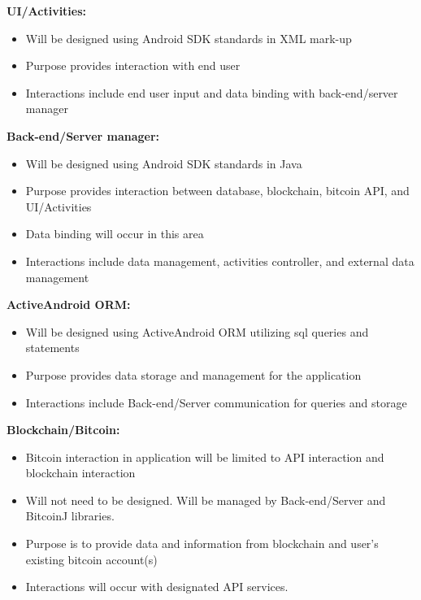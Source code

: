 \textbf{UI/Activities:}\\
\begin{itemize}
\item Will be designed using Android SDK standards in XML mark-up 
\item Purpose provides interaction with end user
\item Interactions include end user input and data binding with back-end/server manager\\
\end{itemize}

\textbf{Back-end/Server manager:}\\
\begin{itemize}
\item Will be designed using Android SDK standards in Java
\item Purpose provides interaction between database, blockchain, bitcoin API, and UI/Activities
\item Data binding will occur in this area
\item Interactions include data management, activities controller, and external data management\\
\end{itemize}

\textbf{ActiveAndroid ORM:}\\
\begin{itemize}
\item Will be designed using  ActiveAndroid ORM utilizing sql queries and statements 
\item Purpose provides data storage and management for the application
\item Interactions include Back-end/Server communication for queries and storage\\
\end{itemize}

\textbf{Blockchain/Bitcoin:}\\
\begin{itemize}
\item Bitcoin interaction in application will be limited to API interaction and blockchain interaction
\item Will not need to be designed. Will be managed by Back-end/Server and BitcoinJ libraries.
\item Purpose is to provide data and information from blockchain and user's existing bitcoin account(s)
\item Interactions will occur with designated API services.\\
\end{itemize}



